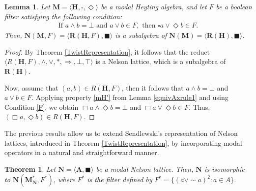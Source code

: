 \documentclass[pdflatex,sn-mathphys-num]{sn-jnl}%
\newtheorem{lemma}{Lemma}
\newcommand{\A}{\mathbf{A}}
\newcommand{\R}[2]{\mathbf{R}(#1,#2)}
\newcommand{\RH}[1]{\mathbf{R}(#1)}
\newcommand{\He}{\mathbf{H}}
\newcommand{\To}{\Rightarrow}
\newcommand{\RN}[2]{R(#1,#2)}
\theoremstyle{thmstyleone}%
\newtheorem{theorem}{Theorem}%
\theoremstyle{thmstyletwo}%
\theoremstyle{thmstylethree}%
\begin{document}
\begin{lemma} \label{ModalHeyting-MN3}
Let $\mathbf{M}=\langle \He, \square, \Diamond \rangle$ be a modal Heyting algebra, and let $F$ be a boolean filter satisfying the following condition:
\begin{align}
    \text{If } a \wedge b = \bot \text{ and } a \vee b \in F, \text{ then } \square a \vee \Diamond b \in F. \tag{F}\label{F}
\end{align}
Then, $\mathbf{N}(\mathbf{M}, F) = \langle \R{\He}{F}, \blacksquare\rangle$ is a subalgebra of $\mathbf{N}(\mathbf{M}) = \langle \RH{\He}, \blacksquare \rangle$.
\end{lemma}
\begin{proof}
By Theorem \ref{TwistRepresentation}, it follows that the reduct $\langle \RN{\mathbf{H}}{F}, \wedge, \vee, *, \To, \bot, \top \rangle$ is a Nelson lattice, which is a subalgebra of $\RH{\He}$. 

Now, assume that $(a, b) \in \RN{\He}{F}$, then it follows that $a \wedge b = \bot$ and $a \vee b \in F$. Applying property \eqref{mH'} from Lemma \ref{equivAxrule1} and using Condition \eqref{F}, we obtain $\Box a \wedge \Diamond b = \bot$ and $\Box a \vee \Diamond b \in F$. Thus, $(\Box a, \Diamond b)\in \RN{\He}{F}$. %
\end{proof}

The previous results allow us to extend Sendlewski’s representation of Nelson lattices, introduced in Theorem \ref{TwistRepresentation}, by incorporating modal operators in a natural and straightforward manner. %


\begin{theorem}\label{isomorfismo}
Let $\mathbf{N} = \langle \A,\blacksquare\rangle$ be a modal Nelson lattice. Then, $\mathbf{N}$ is isomorphic to $\mathbf{N}(\mathbf{M}_\mathbf{N}^*, F^*)$, where $F^*$ is the filter defined by $F^*=\{(a \vee \sim a)^2 : a \in A \}$. 
\end{theorem}
\end{document}
